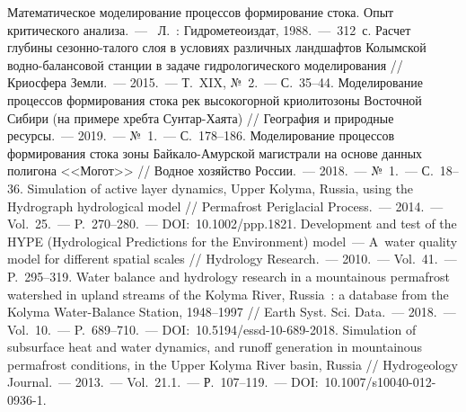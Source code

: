 \begin{thebibliography}{99}
\bibitem{} Математическое моделирование процессов формирование стока. Опыт критического анализа.~---  Л.~: Гидрометеоиздат, 1988.~--- 312~с.
\bibitem{} Расчет глубины сезонно-талого слоя в условиях различных ландшафтов Колымской водно-балансовой станции в задаче гидрологического моделирования // Криосфера Земли.~--- 2015.~--- Т.~XIX, №~2.~--- С.~35--44.
\bibitem{} Моделирование процессов формирования стока рек высокогорной криолитозоны Восточной Сибири (на примере хребта Сунтар-Хаята) // География и природные ресурсы.~--- 2019.~--- №~1.~--- С.~178--186.
\bibitem{} Моделирование процессов формирования стока зоны Байкало-Амурской магистрали на основе данных полигона <<Могот>> // Водное хозяйство России.~--- 2018.~--- №~1.~--- С.~18--36.
\bibitem{} Simulation of active layer dynamics, Upper Kolyma, Russia, using the Hydrograph hydrological model // Permafrost Periglacial Process.~--- 2014.~--- Vol.~25.~--- P.~270--280.~--- DOI:~10.1002/ppp.1821.
\bibitem{} Development and test of the HYPE (Hydrological Predictions for the Environment) model~--- A~water quality model for different spatial scales // Hydrology Research.~--- 2010.~--- Vol.~41.~--- P.~295--319.
\bibitem{} Water balance and hydrology research in a mountainous permafrost watershed in upland streams of the Kolyma River, Russia~: a database from the Kolyma Water-Balance Station, 1948--1997 // Earth Syst. Sci. Data.~--- 2018.~--- Vol.~10.~--- P.~689--710.~--- DOI:~10.5194/essd-10-689-2018.
\bibitem{} Simulation of subsurface heat and water dynamics, and runoff generation in mountainous permafrost conditions, in the Upper Kolyma River basin, Russia // Hydrogeology Journal.~--- 2013.~--- Vol.~21.1.~--- Р.~107--119.~--- DOI:~10.1007/s10040-012-0936-1.

\end{thebibliography}
\thispagestyle{empty}

